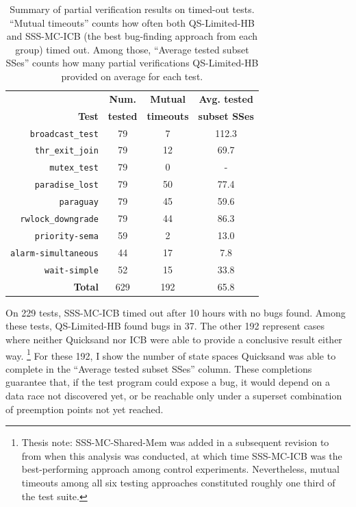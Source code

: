\begin{table}[h]
	\begin{center}
	\small
	\begin{tabular}{r|c||c|c}
		& {\bf Num.} & {\bf Mutual} & {\bf Avg. tested} \\
		{\bf Test} & {\bf tested} & {\bf timeouts} & {\bf subset SSes} \\
		\hline
		{\tt broadcast\_test}    & 79  & 7    & 112.3 \\
		{\tt thr\_exit\_join}    & 79  & {12} & {69.7} \\
		{\tt mutex\_test}        & 79  & 0    & -     \\
		{\tt paradise\_lost}     & 79  & {50} & {77.4} \\
		{\tt paraguay}           & 79  & 45   & {59.6} \\
		{\tt rwlock\_downgrade}  & 79  & {44} & {86.3} \\
		\hline
		{\tt priority-sema}      & 59  & 2    & 13.0  \\
		{\tt alarm-simultaneous} & 44  & {17} & {7.8}  \\
		{\tt wait-simple}        & 52  & {15} & {33.8} \\
		\hline
		{\bf Total}              & 629 & {192}& {65.8} \\
	\end{tabular}
	\end{center}
	\caption[Summary of partial verification results on timed-out tests.]
	{Summary of partial verification results on timed-out tests.
	``Mutual timeouts'' counts how often both QS-Limited-HB and SSS-MC-ICB
	(the best bug-finding approach from each group)
	timed out. %
	Among those, ``Average tested subset SSes'' counts how many partial verifications
	QS-Limited-HB provided on average for each test. %
	}
	\label{tab:partialverifs}
\end{table}

On 229 tests, SSS-MC-ICB timed out after 10 hours with no bugs found. %
Among these tests, QS-Limited-HB %
found bugs in 37.
The other 192 represent cases where neither Quicksand nor ICB were able to provide a conclusive result either way.
\footnote{Thesis note: SSS-MC-Shared-Mem was added in a subsequent revision to \cite{quicksand}
from when this analysis was conducted, at which time SSS-MC-ICB was the best-performing approach among control experiments.
Nevertheless, mutual timeouts among all six testing approaches constituted roughly one third of the test suite.}
For these 192,
I show the number of state spaces Quicksand was able to complete in the
``Average tested subset SSes'' column.
These completions guarantee that, if the test program could expose a bug,
it would depend on a data race not discovered yet,
or be reachable only under a superset combination of preemption points not yet reached.

